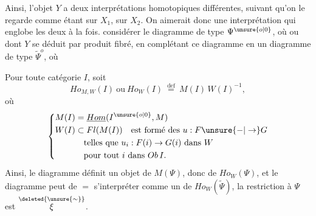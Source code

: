 Ainsi, l'objet $Y$ a deux interprétations homotopiques différentes, suivant qu'on le regarde comme étant sur $X_1$,  sur $X_2$. On aimerait donc une interprétation qui englobe les deux à la fois.    considérer le diagramme
de type $\Psi^{\unsure{o|0}}$, où
ou
dont $Y$ se déduit par produit fibré, en complétant ce diagramme en un diagramme de type $\widetilde\Psi^{o}$, où


Pour toute catégorie $I$, soit
\[
 Ho_{M,W}(I)\ \text{ou}\ Ho_W(I)\ \overset{\mathrm{def}}{=}\ M(I)\,W(I)^{-1},
\]
où
\[
 \left\{\begin{aligned}
 M(I)&=\underline{Hom}(I^{\unsure{o|0}},M)\\
 W(I)&\subset Fl(M(I))\quad\text{est formé des }u:F\unsure{-|\to}G\\
 &\quad\text{telles que }u_i:F(i)\to G(i)\text{ dans }W\\
 &\quad\text{pour tout }i\text{ dans }Ob\,I.
 \end{aligned}\right.
\]
Ainsi, le diagramme
définit un objet \inserted{$\xi$} de $M(\Psi)$, donc de $Ho_W(\Psi)$, et le  diagramme
peut de $=$ s'interpréter comme un  \inserted{$\widetilde\xi$} de $Ho_W(\widetilde\Psi)$,  la restriction à $\Psi$ est $\overset{\deleted{\unsure{\sim}}}{\xi}$.

